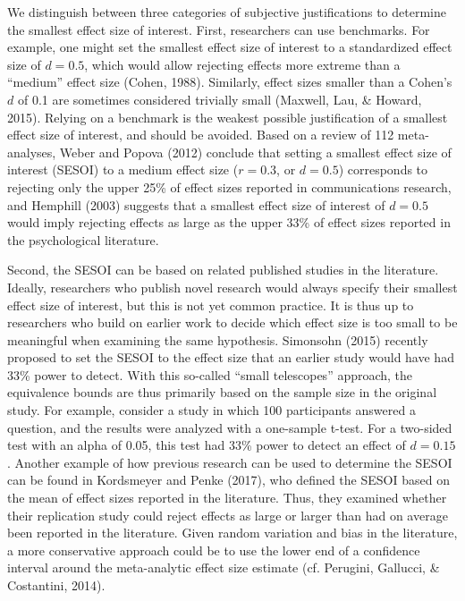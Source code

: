 \documentclass[english,floatsintext,man]{apa6}
\theoremstyle{definition}
\theoremstyle{definition}
\theoremstyle{definition}
\theoremstyle{remark}
\begin{document}
We distinguish between three categories of subjective justifications to
determine the smallest effect size of interest. First, researchers can
use benchmarks. For example, one might set the smallest effect size of
interest to a standardized effect size of \(d = 0.5\), which would allow
rejecting effects more extreme than a \enquote{medium} effect size
(Cohen, 1988). Similarly, effect sizes smaller than a Cohen's \(d\) of
0.1 are sometimes considered trivially small (Maxwell, Lau, \& Howard,
2015). Relying on a benchmark is the weakest possible justification of a
smallest effect size of interest, and should be avoided. Based on a
review of 112 meta-analyses, Weber and Popova (2012) conclude that
setting a smallest effect size of interest (SESOI) to a medium effect
size (\(r = 0.3\), or \(d = 0.5\)) corresponds to rejecting only the
upper 25\% of effect sizes reported in communications research, and
Hemphill (2003) suggests that a smallest effect size of interest of
\(d = 0.5\) would imply rejecting effects as large as the upper 33\% of
effect sizes reported in the psychological literature.

Second, the SESOI can be based on related published studies in the
literature. Ideally, researchers who publish novel research would always
specify their smallest effect size of interest, but this is not yet
common practice. It is thus up to researchers who build on earlier work
to decide which effect size is too small to be meaningful when examining
the same hypothesis. Simonsohn (2015) recently proposed to set the SESOI
to the effect size that an earlier study would have had 33\% power to
detect. With this so-called \enquote{small telescopes} approach, the
equivalence bounds are thus primarily based on the sample size in the
original study. For example, consider a study in which 100 participants
answered a question, and the results were analyzed with a one-sample
t-test. For a two-sided test with an alpha of 0.05, this test had 33\%
power to detect an effect of \(d = 0.15\). Another example of how
previous research can be used to determine the SESOI can be found in
Kordsmeyer and Penke (2017), who defined the SESOI based on the mean of
effect sizes reported in the literature. Thus, they examined whether
their replication study could reject effects as large or larger than had
on average been reported in the literature. Given random variation and
bias in the literature, a more conservative approach could be to use the
lower end of a confidence interval around the meta-analytic effect size
estimate (cf. Perugini, Gallucci, \& Costantini, 2014).
\end{document}

